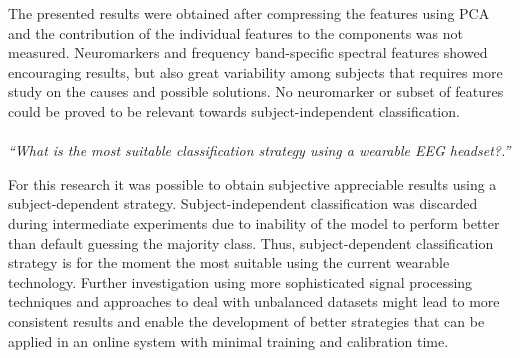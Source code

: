 The presented results were obtained after compressing the features using PCA and the contribution of the individual features to the components was not measured. Neuromarkers and frequency band-specific spectral features showed encouraging results, but also great variability among subjects that requires more study on the causes and possible solutions. No neuromarker or subset of features could be proved to be relevant towards subject-independent classification.
\\
\\
\emph{“What is the most suitable classification strategy using a wearable EEG headset?.”}

For this research it was possible to obtain subjective appreciable results using a subject-dependent strategy. Subject-independent classification was discarded during intermediate experiments due to inability of the model to perform better than default guessing the majority class. Thus, subject-dependent classification strategy is for the moment the most suitable using the current wearable technology. Further investigation using more sophisticated signal processing techniques and approaches to deal with unbalanced datasets might lead to more consistent results and enable the development of better strategies that can be applied in an online system with minimal training and calibration time.



